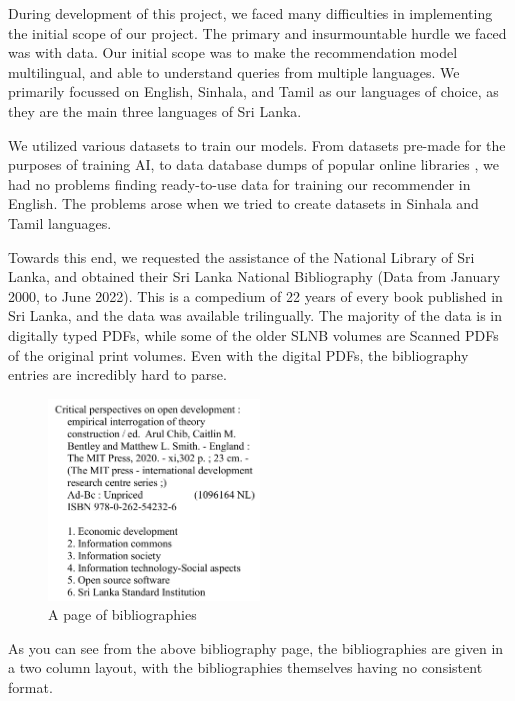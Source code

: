 During development of this project, we faced many difficulties in implementing the initial scope of our project. The primary and insurmountable hurdle we faced was with data. Our initial scope was to make the recommendation model multilingual, and able to understand queries from multiple languages. We primarily focussed on English, Sinhala, and Tamil as our languages of choice, as they are the main three languages of Sri Lanka.

We utilized various datasets to train our models. From datasets pre-made for the purposes of training AI, to data database dumps of popular online libraries \cite{goodbooks-10k-extended}, we had no problems finding ready-to-use data for training our recommender in English. The problems arose when we tried to create datasets in Sinhala and Tamil languages.

Towards this end, we requested the assistance of the National Library of Sri Lanka, and obtained their Sri Lanka National Bibliography \cite{sri_lanka_national_bibliography} (Data from January 2000, to June 2022). This is a compedium of 22 years of every book published in Sri Lanka, and the data was available trilingually. The majority of the data is in digitally typed PDFs, while some of the older SLNB volumes are Scanned PDFs of the original print volumes. Even with the digital PDFs, the bibliography entries are incredibly hard to parse.

\begin{figure}[htbp]
    \centering
    \includegraphics[width=0.5\textwidth]{../../assets/snlb_entry.png}
    \caption{A page of bibliographies}
    \label{fig:slnbpage}
\end{figure}

As you can see from the above bibliography page, the bibliographies are given in a two column layout, with the bibliographies themselves having no consistent format.

